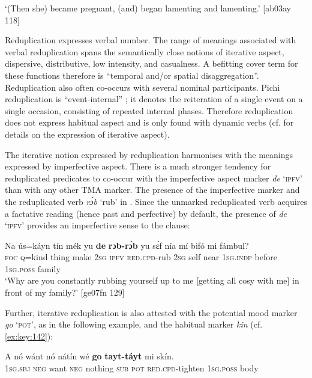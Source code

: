 \glt ‘(Then she) became pregnant, (and) began lamenting and lamenting.’ [ab03ay 118]
\z

Reduplication expresses verbal number. The range of meanings associated with verbal reduplication spans the semantically close notions of iterative aspect, dispersive, distributive, low intensity, and casualness. A befitting cover term for these functions therefore is “temporal and/or spatial disaggregation”. Reduplication also often co-occurs with several nominal participants. Pichi reduplication is “event-internal” \citep[238]{Cusic1981}; it denotes the reiteration of a single event on a single occasion, consisting of repeated internal phases. Therefore reduplication does not express habitual aspect and is only found with dynamic verbs (cf.  for details on the expression of iterative aspect). 


The iterative notion expressed by reduplication harmonises with the meanings expressed by imperfective aspect. There is a much stronger tendency for reduplicated predicates to co-occur with the imperfective aspect marker \textit{de} ‘\textsc{ipfv}’ than with any other TMA marker. The presence of the imperfective marker and the reduplicated verb \textit{rɔ́b} ‘rub’ in . Since the unmarked reduplicated verb acquires a factative reading (hence past and perfective) by default, the presence of \textit{de} ‘\textsc{ipfv’} provides an imperfective sense to the clause:



\ea%
    \label{ex:key:138}
    \gll Na  ús=káyn  tín    mék    yu  \textbf{de}   \textbf{rɔb-rɔ́b}    yu  sɛ́f  nía  mí
bifó    mi    fámbul?\\
\textsc{foc}  \textsc{q}=kind  thing  make  \textsc{2sg}  \textsc{ipfv}  \textsc{red}.\textsc{cpd-}rub  \textsc{2sg}  self  near  \textsc{1sg.indp}
before  \textsc{1sg.poss}  family\\

\glt ‘Why are you constantly rubbing yourself up to me [getting all cosy with me] in front of my family?’ [ge07fn 129]
\z

Further, iterative reduplication is also attested with the potential mood marker \textit{go} ‘\textsc{pot’}, as in the following example, and the habitual marker \textit{kin} (cf. \ref{ex:key:142}):


\ea%
    \label{ex:key:139}
    \gll \MakeUppercase{A}   nó  wánt  nó  nátín  wé  \textbf{go}  \textbf{tayt-táyt}      mi    skín.\\
\textsc{1sg.sbj}  \textsc{neg}  want  \textsc{neg}  nothing  \textsc{sub}  \textsc{pot}  \textsc{red.cpd-}tighten  \textsc{1sg.poss}  body\\

